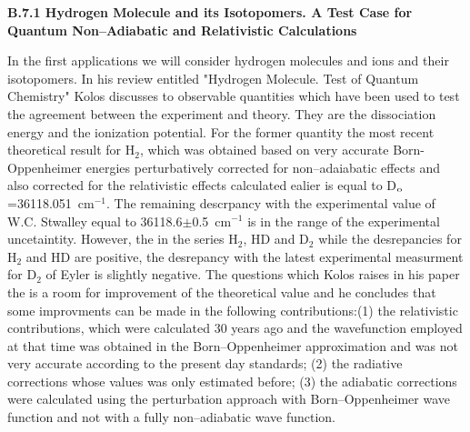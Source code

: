 \vspace{2mm}
\noindent
{\bf B.7.1 Hydrogen Molecule and its Isotopomers. A Test
Case for Quantum Non--Adiabatic and Relativistic Calculations}



In the first applications 
we will consider
hydrogen molecules and ions and their isotopomers.
In his review entitled "Hydrogen Molecule. Test of Quantum Chemistry"
\cite{kk} Kolos discusses to observable quantities which have
been used to test the agreement between the experiment and theory.
They are the dissociation energy and the ionization potential.
For the former quantity the most recent theoretical result
for H$_2$, which was obtained based on very accurate Born-Oppenheimer
energies perturbatively corrected for non--adaiabatic effects
and also corrected for the relativistic effects calculated
ealier is equal to D$_{\rm o}$=36118.051~cm$^{-1}$. The remaining
descrpancy with the experimental value of W.C. Stwalley\cite{k29}
equal to 36118.6$\pm$0.5~cm$^{-1}$ is in the range of the
experimental uncetaintity.
However, the in the series H$_2$, HD and D$_2$ while the
desrepancies for H$_2$ and HD are positive, the desrepancy
with the latest experimental measurment for D$_2$ of
Eyler\cite{k42,k42p}
is slightly negative.
The questions which Kolos raises
in his paper the is a room for improvement of the theoretical
value and he concludes that some improvments can be made
in the following contributions:(1) the relativistic contributions,
which were calculated 30 years ago and the wavefunction
employed at that time was obtained in the Born--Oppenheimer
approximation and was not very accurate according to the present
day standards; (2) the radiative corrections whose values
was only estimated before\cite{k16}; (3) the adiabatic corrections
were calculated using the perturbation approach with Born--Oppenheimer
wave function and not with a fully non--adiabatic wave function.

